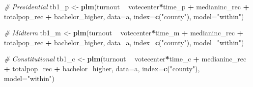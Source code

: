 \documentclass[
]{article}
\newenvironment{Shaded}{\begin{snugshade}}{\end{snugshade}}
\newcommand{\CommentTok}[1]{\textcolor[rgb]{0.56,0.35,0.01}{\textit{#1}}}
\newcommand{\DataTypeTok}[1]{\textcolor[rgb]{0.13,0.29,0.53}{#1}}
\newcommand{\KeywordTok}[1]{\textcolor[rgb]{0.13,0.29,0.53}{\textbf{#1}}}
\newcommand{\NormalTok}[1]{#1}
\newcommand{\OperatorTok}[1]{\textcolor[rgb]{0.81,0.36,0.00}{\textbf{#1}}}
\newcommand{\StringTok}[1]{\textcolor[rgb]{0.31,0.60,0.02}{#1}}
\begin{document}
\begin{Shaded}
\begin{Highlighting}[]
\CommentTok{# Presidential}
\NormalTok{tb1_p <-}\StringTok{ }\KeywordTok{plm}\NormalTok{(turnout }\OperatorTok{~}\StringTok{ }\NormalTok{votecenter}\OperatorTok{*}\NormalTok{time_p }\OperatorTok{+}\StringTok{ }\NormalTok{medianinc_rec }\OperatorTok{+}\StringTok{ }\NormalTok{totalpop_rec }\OperatorTok{+}\StringTok{ }\NormalTok{bachelor_higher, }\DataTypeTok{data=}\NormalTok{a, }\DataTypeTok{index=}\KeywordTok{c}\NormalTok{(}\StringTok{"county"}\NormalTok{), }\DataTypeTok{model=}\StringTok{"within"}\NormalTok{)}

\CommentTok{# Midterm}
\NormalTok{tb1_m <-}\StringTok{ }\KeywordTok{plm}\NormalTok{(turnout }\OperatorTok{~}\StringTok{ }\NormalTok{votecenter}\OperatorTok{*}\NormalTok{time_m }\OperatorTok{+}\StringTok{ }\NormalTok{medianinc_rec }\OperatorTok{+}\StringTok{ }\NormalTok{totalpop_rec }\OperatorTok{+}\StringTok{ }\NormalTok{bachelor_higher, }\DataTypeTok{data=}\NormalTok{a, }\DataTypeTok{index=}\KeywordTok{c}\NormalTok{(}\StringTok{"county"}\NormalTok{), }\DataTypeTok{model=}\StringTok{"within"}\NormalTok{) }

\CommentTok{# Constitutional}
\NormalTok{tb1_c <-}\StringTok{ }\KeywordTok{plm}\NormalTok{(turnout }\OperatorTok{~}\StringTok{ }\NormalTok{votecenter}\OperatorTok{*}\NormalTok{time_c }\OperatorTok{+}\StringTok{ }\NormalTok{medianinc_rec }\OperatorTok{+}\StringTok{ }\NormalTok{totalpop_rec }\OperatorTok{+}\StringTok{ }\NormalTok{bachelor_higher, }\DataTypeTok{data=}\NormalTok{a, }\DataTypeTok{index=}\KeywordTok{c}\NormalTok{(}\StringTok{"county"}\NormalTok{), }\DataTypeTok{model=}\StringTok{"within"}\NormalTok{) }


\end{Highlighting}
\end{Shaded}
\end{document}
